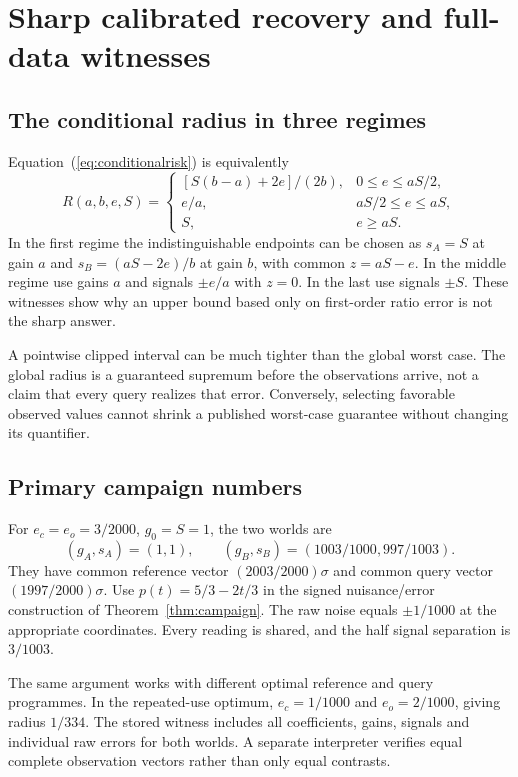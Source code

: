\documentclass[11pt,letterpaper]{article}
\theoremstyle{definition}\newtheorem{definition}[theorem]{Definition}
\theoremstyle{remark}\newtheorem{remark}[theorem]{Remark}
\begin{document}
\section{Sharp calibrated recovery and full-data witnesses}
\label{app:witness}
\subsection{The conditional radius in three regimes}
Equation~(\ref{eq:conditionalrisk}) is equivalently
\begin{equation}
R(a,b,e,S)=
\begin{cases}
 [S(b-a)+2e]/(2b), & 0\le e\le aS/2,\\
 e/a, & aS/2\le e\le aS,\\
 S, & e\ge aS.
\end{cases}
\end{equation}
In the first regime the indistinguishable endpoints can be chosen as $s_A=S$ at gain $a$ and $s_B=(aS-2e)/b$ at gain $b$, with common $z=aS-e$. In the middle regime use gains $a$ and signals $\pm e/a$ with $z=0$. In the last use signals $\pm S$. These witnesses show why an upper bound based only on first-order ratio error is not the sharp answer.

A pointwise clipped interval can be much tighter than the global worst case. The global radius is a guaranteed supremum before the observations arrive, not a claim that every query realizes that error. Conversely, selecting favorable observed values cannot shrink a published worst-case guarantee without changing its quantifier.

\subsection{Primary campaign numbers}
For $e_c=e_o=3/2000$, $g_0=S=1$, the two worlds are
\begin{equation}
(g_A,s_A)=(1,1),\qquad(g_B,s_B)=(1003/1000,997/1003).
\end{equation}
They have common reference vector $(2003/2000)\sigma$ and common query vector $(1997/2000)\sigma$. Use $p(t)=5/3-2t/3$ in the signed nuisance/error construction of Theorem~\ref{thm:campaign}. The raw noise equals $\pm1/1000$ at the appropriate coordinates. Every reading is shared, and the half signal separation is $3/1003$.

The same argument works with different optimal reference and query programmes. In the repeated-use optimum, $e_c=1/1000$ and $e_o=2/1000$, giving radius $1/334$. The stored witness includes all coefficients, gains, signals and individual raw errors for both worlds. A separate interpreter verifies equal complete observation vectors rather than only equal contrasts.
\end{document}
